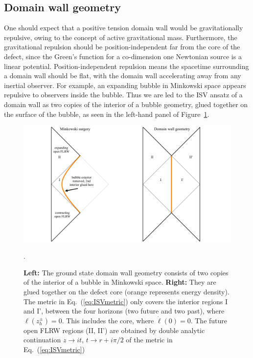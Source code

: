 \documentclass[aps,amsfonts,amsmath,prd,preprint,nofootinbib,superscriptaddress]{revtex4}
\begin{document}
\begin{appendix}
\subsection{Domain wall geometry}
One should expect that a positive tension domain wall would be gravitationally repulsive, owing to the concept of active gravitational mass.  Furthermore, 
the gravitational repulsion should be position-independent far from the core of the defect, since the Green's function for a co-dimension one Newtonian
source is a linear potential.  Position-independent repulsion means the spacetime surrounding a domain wall should be flat, with the domain wall accelerating away from any inertial observer.  
For example, an expanding bubble in Minkowski space appears repulsive to observers inside the bubble.  Thus we are led to the ISV ansatz
of a domain wall as two copies of the interior of a bubble geometry, glued together on the surface of the bubble, as seen in the left-hand panel of Figure~\ref{fig:ISV}.
\begin{figure}[htbp]
\begin{center}
\includegraphics[width=1\textwidth]{figures/ISVbubble}
\caption{{\bf Left:} The ground state domain wall geometry consists of two copies of the interior of a bubble in Minkowski space.    {\bf Right:} They are glued together on the defect core (orange represents energy density). 
The metric in Eq.~(\ref{eq:ISVmetric}) only covers the interior regions I and I', between the four horizons (two future and two past), where $\ell(z_h^\pm) = 0$.  This includes the core, where $\dot\ell(0) = 0$. The future open FLRW regions (II, II') are obtained by
double analytic continuation $z\to i t$, $t \to r + i\pi/2$ of the metric in Eq.~(\ref{eq:ISVmetric})}.
\label{fig:ISV}
\end{center}
\end{figure}



\end{appendix}
\end{document}
